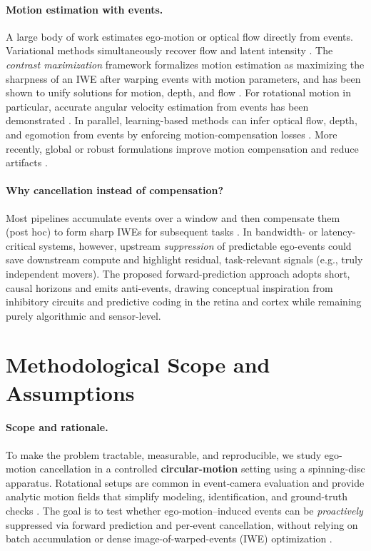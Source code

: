 \paragraph{Motion estimation with events.}
A large body of work estimates ego-motion or optical flow directly from events. Variational methods simultaneously recover flow and latent intensity \cite{Bardow2016SOFIE}. The \emph{contrast maximization} framework formalizes motion estimation as maximizing the sharpness of an IWE after warping events with motion parameters, and has been shown to unify solutions for motion, depth, and flow \cite{Gallego2018CMax}. For rotational motion in particular, accurate angular velocity estimation from events has been demonstrated \cite{Gallego2017Angular}. In parallel, learning-based methods can infer optical flow, depth, and egomotion from events by enforcing motion-compensation losses \cite{Zhu2019Unsupervised}. More recently, global or robust formulations improve motion compensation and reduce artifacts  \cite{Xu2020TCI}.

\paragraph{Why cancellation instead of compensation?}
Most pipelines accumulate events over a window and then compensate them (post hoc) to form sharp IWEs for subsequent tasks \cite{Gallego2018CMax,Stoffregen2019Segmentation}. In bandwidth- or latency-critical systems, however, upstream \emph{suppression} of predictable ego-events could save downstream compute and highlight residual, task-relevant signals (e.g., truly independent movers). The proposed forward-prediction approach adopts short, causal horizons and emits anti-events, drawing conceptual inspiration from inhibitory circuits and predictive coding in the retina and cortex \cite{Hosoya2005RetinaPC,Rao1999V1PC} while remaining purely algorithmic and sensor-level.

\section{Methodological Scope and Assumptions}
\label{sec:scope-assumptions}

\paragraph{Scope and rationale.}
To make the problem tractable, measurable, and reproducible, we study ego-motion cancellation in a controlled \textbf{circular-motion} setting using a spinning-disc apparatus. Rotational setups are common in event-camera evaluation and provide analytic motion fields that simplify modeling, identification, and ground-truth checks \cite{Gallego2017Angular,Stoffregen2019Segmentation}. The goal is to test whether ego-motion–induced events can be \emph{proactively} suppressed via forward prediction and per-event cancellation, without relying on batch accumulation or dense image-of-warped-events (IWE) optimization \cite{Gallego2018CMax,Bardow2016SOFIE}.

